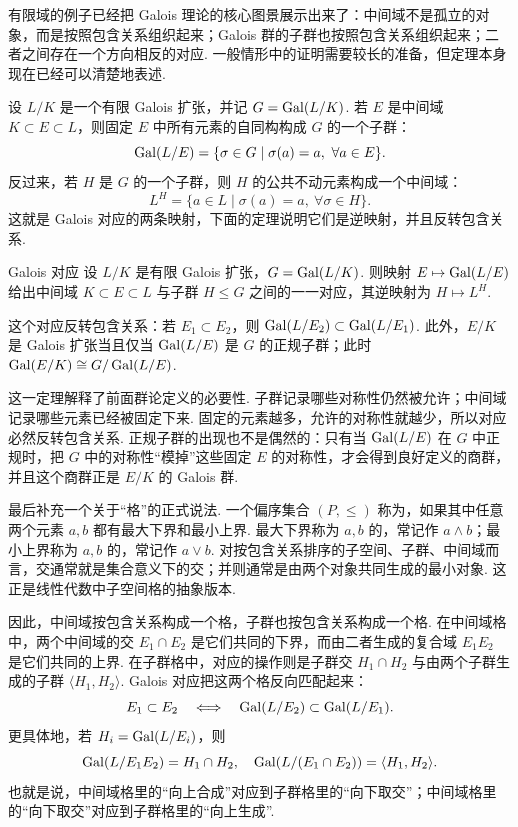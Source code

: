 有限域的例子已经把 Galois 理论的核心图景展示出来了：中间域不是孤立的对象，而是按照包含关系组织起来；Galois 群的子群也按照包含关系组织起来；二者之间存在一个方向相反的对应. 一般情形中的证明需要较长的准备，但定理本身现在已经可以清楚地表述.

设 $L/K$ 是一个有限 Galois 扩张，并记 $G=\operatorname{Gal}(L/K)$. 若 $E$ 是中间域 $K\subset E\subset L$，则固定 $E$ 中所有元素的自同构构成 $G$ 的一个子群：
\[
    \operatorname{Gal}(L/E)=\{\sigma\in G\mid \sigma(a)=a,\ \forall a\in E\}.
\]
反过来，若 $H$ 是 $G$ 的一个子群，则 $H$ 的公共不动元素构成一个中间域：
\[
    L^H=\{a\in L\mid \sigma(a)=a,\ \forall\sigma\in H\}.
\]
这就是 Galois 对应的两条映射，下面的定理说明它们是逆映射，并且反转包含关系.

\begin{theorem}{Galois 对应}{}
    设 $L/K$ 是有限 Galois 扩张，$G=\operatorname{Gal}(L/K)$. 则映射 $E\mapsto \operatorname{Gal}(L/E)$ 给出中间域 $K\subset E\subset L$ 与子群 $H\leq G$ 之间的一一对应，其逆映射为 $H\mapsto L^H$.

    这个对应反转包含关系：若 $E_1\subset E_2$，则 $\operatorname{Gal}(L/E_2)\subset \operatorname{Gal}(L/E_1)$. 此外，$E/K$ 是 Galois 扩张当且仅当 $\operatorname{Gal}(L/E)$ 是 $G$ 的正规子群；此时 $\operatorname{Gal}(E/K)\cong G/\operatorname{Gal}(L/E)$.
\end{theorem}

这一定理解释了前面群论定义的必要性. 子群记录哪些对称性仍然被允许；中间域记录哪些元素已经被固定下来. 固定的元素越多，允许的对称性就越少，所以对应必然反转包含关系. 正规子群的出现也不是偶然的：只有当 $\operatorname{Gal}(L/E)$ 在 $G$ 中正规时，把 $G$ 中的对称性``模掉''这些固定 $E$ 的对称性，才会得到良好定义的商群，并且这个商群正是 $E/K$ 的 Galois 群.

最后补充一个关于``格''的正式说法. 一个偏序集合 $(P,\leq)$ 称为，如果其中任意两个元素 $a,b$ 都有最大下界和最小上界. 最大下界称为 $a,b$ 的，常记作 $a\wedge b$；最小上界称为 $a,b$ 的，常记作 $a\vee b$. 对按包含关系排序的子空间、子群、中间域而言，交通常就是集合意义下的交；并则通常是由两个对象共同生成的最小对象. 这正是线性代数中子空间格的抽象版本.

因此，中间域按包含关系构成一个格，子群也按包含关系构成一个格. 在中间域格中，两个中间域的交 $E_1\cap E_2$ 是它们共同的下界，而由二者生成的复合域 $E_1E_2$ 是它们共同的上界. 在子群格中，对应的操作则是子群交 $H_1\cap H_2$ 与由两个子群生成的子群 $\langle H_1,H_2\rangle$. Galois 对应把这两个格反向匹配起来：
\[
    E_1\subset E_2
    \quad\Longleftrightarrow\quad
    \operatorname{Gal}(L/E_2)\subset \operatorname{Gal}(L/E_1).
\]
更具体地，若 $H_i=\operatorname{Gal}(L/E_i)$，则
\[
    \operatorname{Gal}(L/E_1E_2)=H_1\cap H_2,
    \quad
    \operatorname{Gal}(L/(E_1\cap E_2))=\langle H_1,H_2\rangle.
\]
也就是说，中间域格里的``向上合成''对应到子群格里的``向下取交''；中间域格里的``向下取交''对应到子群格里的``向上生成''.


